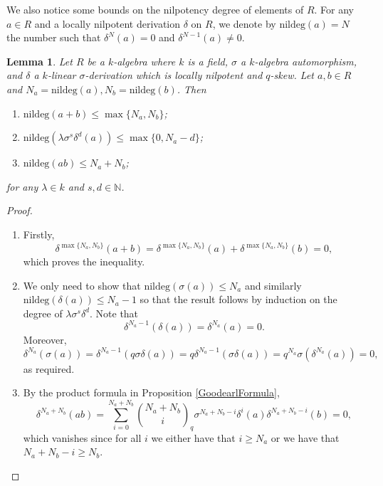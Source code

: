 \documentclass[12pt]{amsart}
\newtheorem{lem}[thm]{Lemma}
\theoremstyle{definition}
\theoremstyle{definition}
\theoremstyle{definition}
\theoremstyle{remark}
\theoremstyle{definition}
\begin{document}
We also notice some bounds on the nilpotency degree of elements of $R$. For any $a \in R$ and a locally nilpotent derivation $\delta$ on $R$, we denote by $\text{nildeg}(a) = N$ the number such that $\delta^N(a) = 0$ and $\delta^{N-1}(a) \neq 0$. 

\begin{lem}
    \label{nildeglem}
    Let $R$ be a $k$-algebra where $k$ is a field, $\sigma$ a $k$-algebra automorphism, and $\delta$ a $k$-linear
    $\sigma$-derivation which is locally nilpotent and $q$-skew. Let $a,b \in R$ and $N_a = \text{nildeg}(a), N_b = \text{nildeg}(b)$. Then \begin{enumerate}
        \item \label{nildeg1}$\text{nildeg}(a+b)\leq \max\{N_a,N_b\}$;
        \item\label{nildeg3}$\text{nildeg}(\lambda\sigma^s\delta^d(a))\leq\max\{0,N_a-d\}$;
        \item\label{nildeg2}$\text{nildeg}(ab)\leq N_a+N_b  $;
    \end{enumerate}
    for any $\lambda\in k$ and $s,d \in \mathbb{N}$.
\end{lem}

\begin{proof}
\begin{enumerate}
    \item 

    Firstly,\[
        \delta^{\max\{N_a,N_b\}}(a+b) = \delta^{\max\{N_a,N_b\}}(a)+\delta^{\max\{N_a,N_b\}}(b) = 0,
    \] which proves the inequality.

    \item We only need to show that $\text{nildeg}(\sigma(a))\leq N_a$ and similarly $\text{nildeg}(\delta(a))\leq N_a-1$ so that the result follows by induction on the degree of $\lambda\sigma^s\delta^d$. Note that \[
        \delta^{N_a-1}(\delta(a)) = \delta^{N_a}(a)=0.
    \] Moreover,\[
        \delta^{N_a}(\sigma(a)) = \delta^{N_a-1}(q\sigma\delta(a)) = q \delta^{N_a-1}(\sigma\delta(a)) = q^{N_a}\sigma(\delta^{N_a}(a)) = 0,
    \]as required.

    \item By the product formula in Proposition \ref{GoodearlFormula},\[
        \delta^{N_a+N_b}(ab) = \sum_{i=0}^{N_a+N_b}\binom{N_a+N_b}{i}_q\sigma^{N_a+N_b-i}\delta^i(a)\delta^{N_a+N_b-i}(b) = 0,
    \] which vanishes since for all $i$ we either have that $i \geq N_a$ or we have that $N_a+N_b-i \geq N_b$. 

    \end{enumerate}
    
\end{proof}
\end{document}
